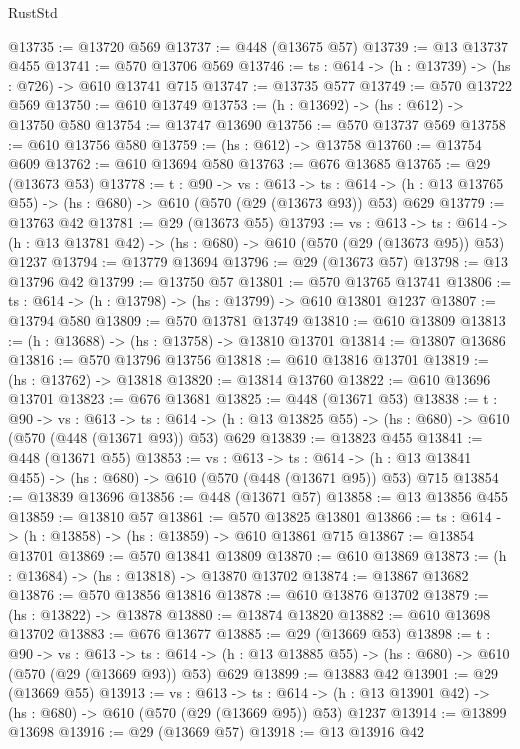 \begin{lexlean}{RustStd}
\begin{coremodule}
@13735 := @13720 @569
@13737 := @448 (@13675 @57)
@13739 := @13 @13737 @455
@13741 := @570 @13706 @569
@13746 := {ts : @614} -> (h : @13739) -> (hs : @726) -> @610 @13741 @715
@13747 := @13735 @577
@13749 := @570 @13722 @569
@13750 := @610 @13749
@13753 := (h : @13692) -> (hs : @612) -> @13750 @580
@13754 := @13747 @13690
@13756 := @570 @13737 @569
@13758 := @610 @13756 @580
@13759 := (hs : @612) -> @13758
@13760 := @13754 @609
@13762 := @610 @13694 @580
@13763 := @676 @13685
@13765 := @29 (@13673 @53)
@13778 := {t : @90} ->
  {vs : @613} ->
  {ts : @614} -> (h : @13 @13765 @55) -> (hs : @680) -> @610 (@570 (@29 (@13673 @93)) @53) @629
@13779 := @13763 @42
@13781 := @29 (@13673 @55)
@13793 := {vs : @613} ->
  {ts : @614} -> (h : @13 @13781 @42) -> (hs : @680) -> @610 (@570 (@29 (@13673 @95)) @53) @1237
@13794 := @13779 @13694
@13796 := @29 (@13673 @57)
@13798 := @13 @13796 @42
@13799 := @13750 @57
@13801 := @570 @13765 @13741
@13806 := {ts : @614} -> (h : @13798) -> (hs : @13799) -> @610 @13801 @1237
@13807 := @13794 @580
@13809 := @570 @13781 @13749
@13810 := @610 @13809
@13813 := (h : @13688) -> (hs : @13758) -> @13810 @13701
@13814 := @13807 @13686
@13816 := @570 @13796 @13756
@13818 := @610 @13816 @13701
@13819 := (hs : @13762) -> @13818
@13820 := @13814 @13760
@13822 := @610 @13696 @13701
@13823 := @676 @13681
@13825 := @448 (@13671 @53)
@13838 := {t : @90} ->
  {vs : @613} ->
  {ts : @614} -> (h : @13 @13825 @55) -> (hs : @680) -> @610 (@570 (@448 (@13671 @93)) @53) @629
@13839 := @13823 @455
@13841 := @448 (@13671 @55)
@13853 := {vs : @613} ->
  {ts : @614} -> (h : @13 @13841 @455) -> (hs : @680) -> @610 (@570 (@448 (@13671 @95)) @53) @715
@13854 := @13839 @13696
@13856 := @448 (@13671 @57)
@13858 := @13 @13856 @455
@13859 := @13810 @57
@13861 := @570 @13825 @13801
@13866 := {ts : @614} -> (h : @13858) -> (hs : @13859) -> @610 @13861 @715
@13867 := @13854 @13701
@13869 := @570 @13841 @13809
@13870 := @610 @13869
@13873 := (h : @13684) -> (hs : @13818) -> @13870 @13702
@13874 := @13867 @13682
@13876 := @570 @13856 @13816
@13878 := @610 @13876 @13702
@13879 := (hs : @13822) -> @13878
@13880 := @13874 @13820
@13882 := @610 @13698 @13702
@13883 := @676 @13677
@13885 := @29 (@13669 @53)
@13898 := {t : @90} ->
  {vs : @613} ->
  {ts : @614} -> (h : @13 @13885 @55) -> (hs : @680) -> @610 (@570 (@29 (@13669 @93)) @53) @629
@13899 := @13883 @42
@13901 := @29 (@13669 @55)
@13913 := {vs : @613} ->
  {ts : @614} -> (h : @13 @13901 @42) -> (hs : @680) -> @610 (@570 (@29 (@13669 @95)) @53) @1237
@13914 := @13899 @13698
@13916 := @29 (@13669 @57)
@13918 := @13 @13916 @42

\end{coremodule}
\end{lexlean}
